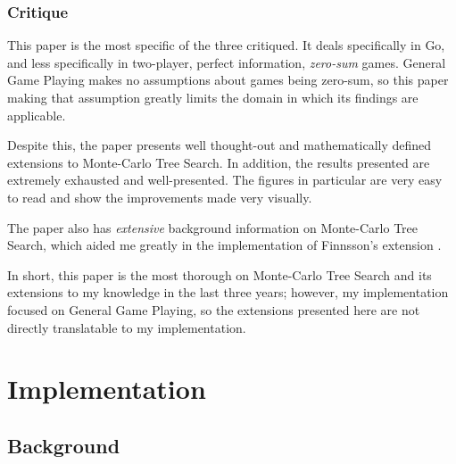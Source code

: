 \documentclass[letterpaper]{article}
\begin{document}
\subsubsection{Critique}
This paper is the most specific of the three critiqued. It deals specifically in Go, and less specifically in two-player, perfect information, \emph{zero-sum} games. General Game Playing makes no assumptions about games being zero-sum, so this paper making that assumption greatly limits the domain in which its findings are applicable.

Despite this, the paper presents well thought-out and mathematically defined extensions to Monte-Carlo Tree Search. In addition, the results presented are extremely exhausted and well-presented. The figures in particular are very easy to read and show the improvements made very visually.

The paper also has \emph{extensive} background information on Monte-Carlo Tree Search, which aided me greatly in the implementation of Finnsson's extension \cite{finnsson2012generalized}.

In short, this paper is the most thorough on Monte-Carlo Tree Search and its extensions to my knowledge in the last three years; however, my implementation focused on General Game Playing, so the extensions presented here are not directly translatable to my implementation.

\section{Implementation}

\subsection{Background}
\end{document}

